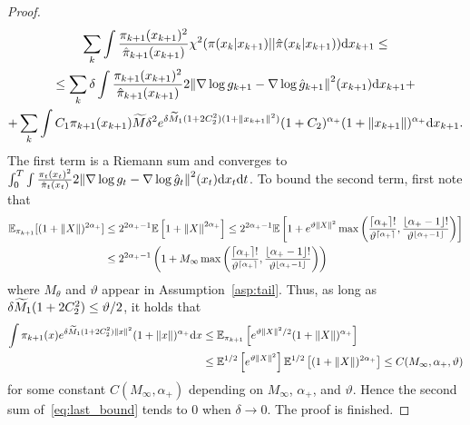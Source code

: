 \documentclass{article}
\theoremstyle{plain}
\theoremstyle{definition}
\theoremstyle{remark}
\begin{document}
\begin{proof}
\begin{multline}
		\label{eq:last_bound}
		\sum_k \int \frac{\pi_{k+1}(x_{k+1})^2}{\hat \pi_{k+1}(x_{k+1})} \chi^2(\pi(x_k|x_{k+1})||\hat\pi(x_k|x_{k+1})) \dd x_{k+1} \leq \\ \leq \sum_k \delta \int \frac{\pi_{k+1}(x_{k+1})^2}{\hat\pi_{k+1}(x_{k+1})} 2 \norm{\nabla\log g_{k+1}-\nabla\log \hat g_{k+1}}^2(x_{k+1}) \dd x_{k+1} + \\ + \sum_k\int C_1 \pi_{k+1}(x_{k+1})\widetilde M \delta^2 e^{\delta \widetilde M_1 (1+2C_2^2)(1+\norm{x_{k+1}}^2)} (1+C_2)^{\alpha_+} (1+\norm{x_{k+1}})^{\alpha_+} \dd x_{k+1}.
	\end{multline}
	The first term is a Riemann sum and converges to $\int_0^T \int \frac{\pi_t(x_t)^2}{\hat \pi_t(x_t)} 2 \norm{\nabla\log g_t - \nabla\log\hat g_t}^2(x_t) \dd x_t \dd t$. To bound the second term, first note that
	\newcommand{\epikpo}{\E_{\pi_{k+1}}}
	\begin{align*}
		\epikpo[(1 + \norm{X})^{2\alpha_+}] & \leq 2^{2\alpha_+-1} \E\ps{1 + \norm{X}^{2\alpha_+}} \leq 2^{2\alpha_+-1} \E\ps{1 +
			e^{\vartheta \norm{X}^2} \max\pr{\frac{\lceil \alpha_+\rceil !}{\vartheta^{\lceil \alpha_+ \rceil}}, \frac{\lfloor \alpha_+ -1\rfloor !}{\vartheta^{\lfloor \alpha_+ -1 \rfloor }}}
		}                                                                                                                         \\ &\leq 2^{2\alpha_+-1} \pr{1 + M_\infty\max\pr{\frac{\lceil \alpha_+\rceil !}{\vartheta^{\lceil \alpha_+ \rceil}}, \frac{\lfloor \alpha_+ -1\rfloor !}{\vartheta^{\lfloor \alpha_+ -1 \rfloor }}}}
	\end{align*}
	where $M_\theta$ and $\vartheta$ appear in Assumption~\ref{asp:tail}. Thus, as long as $\delta \widetilde M_1 (1+2C_2^2) \leq \vartheta/2$, it holds that
	\begin{align*}
		\int \pi_{k+1}(x) e^{\delta \wtm_1(1+2C_2^2) \norm{x}^2}(1+\norm{x})^{\alpha_+} \dd x & \leq \epikpo\ps{e^{\vartheta \norm{X}^2/2} (1+\norm{X})^{\alpha_+}}                                                      \\
		                                                                                      & \leq \E^{1/2}\ps{e^{\vartheta \norm{X}^2}} \E^{1/2}\ps{(1 + \norm{X})^{2\alpha_+}} \leq C(M_\infty, \alpha_+, \vartheta)
	\end{align*}
	for some constant $C(M_\infty, \alpha_+)$ depending on $M_\infty$, $\alpha_+$, and $\vartheta$. Hence the second sum of~\eqref{eq:last_bound} tends to $0$ when $\delta\to0$. The proof is finished.
\end{proof}
\end{document}

